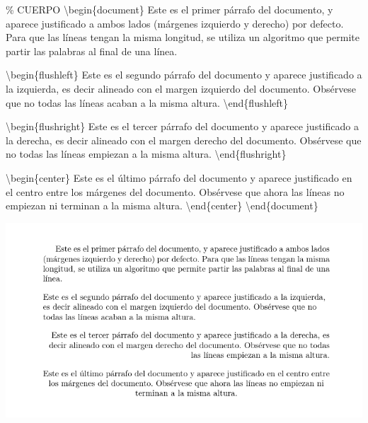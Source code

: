 \documentclass[
  letterpaper,
  DIV=11,
  numbers=noendperiod]{scrreport}
\newenvironment{Shaded}{\begin{snugshade}}{\end{snugshade}}
\newcommand{\CommentTok}[1]{\textcolor[rgb]{0.37,0.37,0.37}{#1}}
\newcommand{\ExtensionTok}[1]{\textcolor[rgb]{0.00,0.23,0.31}{#1}}
\newcommand{\KeywordTok}[1]{\textcolor[rgb]{0.00,0.23,0.31}{#1}}
\newcommand{\NormalTok}[1]{\textcolor[rgb]{0.00,0.23,0.31}{#1}}
\begin{document}
\begin{Shaded}
\begin{Highlighting}[]
\CommentTok{\% CUERPO}
\KeywordTok{\textbackslash{}begin}\NormalTok{\{}\ExtensionTok{document}\NormalTok{\}}
\NormalTok{Este es el primer párrafo del documento, y aparece justificado a ambos lados}
\NormalTok{(márgenes izquierdo y derecho) por defecto. Para que las líneas tengan la }
\NormalTok{misma longitud, se utiliza un algoritmo que permite partir las palabras al }
\NormalTok{final de una línea.}

\KeywordTok{\textbackslash{}begin}\NormalTok{\{}\ExtensionTok{flushleft}\NormalTok{\}}
\NormalTok{Este es el segundo párrafo del documento y aparece justificado a la }
\NormalTok{izquierda, es decir alineado con el margen izquierdo del documento. }
\NormalTok{Obsérvese que no todas las líneas acaban a la misma altura.}
\KeywordTok{\textbackslash{}end}\NormalTok{\{}\ExtensionTok{flushleft}\NormalTok{\}}

\KeywordTok{\textbackslash{}begin}\NormalTok{\{}\ExtensionTok{flushright}\NormalTok{\}}
\NormalTok{Este es el tercer párrafo del documento y aparece justificado a la derecha,}
\NormalTok{es decir alineado con el margen derecho del documento. Obsérvese que no }
\NormalTok{todas las líneas empiezan a la misma altura.}
\KeywordTok{\textbackslash{}end}\NormalTok{\{}\ExtensionTok{flushright}\NormalTok{\}}

\KeywordTok{\textbackslash{}begin}\NormalTok{\{}\ExtensionTok{center}\NormalTok{\}}
\NormalTok{Este es el último párrafo del documento y aparece justificado en el centro}
\NormalTok{entre los márgenes del documento. Obsérvese que ahora las líneas no }
\NormalTok{empiezan ni terminan a la misma altura. }
\KeywordTok{\textbackslash{}end}\NormalTok{\{}\ExtensionTok{center}\NormalTok{\}}
\KeywordTok{\textbackslash{}end}\NormalTok{\{}\ExtensionTok{document}\NormalTok{\}}
\end{Highlighting}
\end{Shaded}

\begin{tcolorbox}[enhanced jigsaw, arc=.35mm, toprule=.15mm, opacitybacktitle=0.6, colback=white, coltitle=black, colbacktitle=quarto-callout-note-color!10!white, breakable, colframe=quarto-callout-note-color-frame, left=2mm, opacityback=0, bottomtitle=1mm, toptitle=1mm, titlerule=0mm, title={Salida}, bottomrule=.15mm, leftrule=.75mm, rightrule=.15mm]
\includegraphics{./img/secciones/justificacion.png}
\end{tcolorbox}
\end{document}
